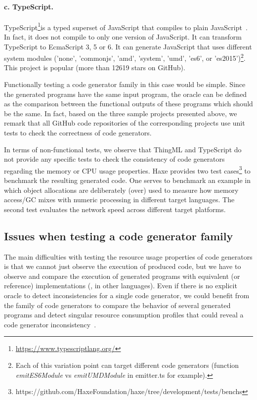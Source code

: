 \paragraph{c. TypeScript.} TypeScript\footnote{\url{https://www.typescriptlang.org/}}is a typed superset of JavaScript that compiles to plain JavaScript~\cite{rastogi2015safe}. In fact, it does not compile to only one version of JavaScript. It can transform TypeScript to EcmaScript 3, 5 or 6. It can generate JavaScript that uses different system modules ('none', 'commonjs', 'amd', 'system', 'umd', 'es6', or 'es2015')\footnote{Each of this variation point can target different code generators (function \textit{emitES6Module} vs \textit{emitUMDModule} in emitter.ts for example).}. 
This project is popular (more than \num{12619} stars on GitHub).

Functionally testing a code generator family in this case would be simple. Since the generated programs have the same input program, the oracle can be defined as the comparison between the functional outputs of these programs which should be the same.
In fact, based on the three sample projects presented above, we remark that all GitHub code repositories of the corresponding projects use unit tests to check the correctness of code generators.  

In terms of non-functional tests, we observe that ThingML and TypeScript do not provide any specific tests to check the consistency of code generators regarding the memory or CPU usage properties. Haxe provides two test cases\footnote{https://github.com/HaxeFoundation/haxe/tree/development/tests/benchs} to benchmark the resulting generated code. One serves to benchmark an example in which object allocations are deliberately (over) used to measure how memory access/GC mixes with numeric processing in different target languages. The second test evaluates the network speed across different target platforms.


\subsection{Issues when testing a code generator family}

The main difficulties with testing the resource usage properties of code generators is that we cannot just observe the execution of produced code, but we have to observe and compare the execution of generated programs with equivalent (or reference) implementations (\ie, in other languages). Even if there is no explicit oracle to detect inconsistencies for a single code generator, we could benefit from the family of code generators to compare the behavior of several generated programs and detect singular resource consumption profiles that could reveal a code generator inconsistency~\cite{hundt2011loop}. 

